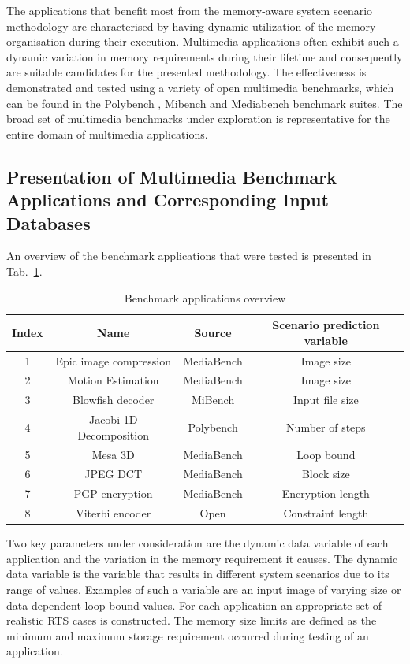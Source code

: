 \documentclass[smallcondensed]{svjour3}
\begin{document}
The applications that benefit most from the memory-aware system scenario methodology are characterised by having dynamic utilization of the memory organisation during their execution. 
Multimedia applications often exhibit such a dynamic variation in memory requirements during their lifetime and consequently are suitable candidates for the presented methodology.
The effectiveness is demonstrated and tested using a variety of open multimedia benchmarks, which can be found in the Polybench \cite{Poly}, Mibench \cite{mibench} and Mediabench \cite{mediabench} benchmark suites.
The broad set of multimedia benchmarks under exploration is representative for the entire domain of multimedia applications. 

\subsection{Presentation of Multimedia Benchmark Applications and Corresponding Input Databases}

An overview of the benchmark applications that were tested is presented in Tab.~\ref{tab:app1}. 

\begin{table}
\caption{Benchmark applications overview}
\label{tab:app1}
{
\begin{tabular}{|c|c|c|c|}
\hline
\textbf{Index} & \textbf{Name} & \textbf{Source} & \textbf{Scenario prediction variable}\\ 
\hline 
1 & Epic image compression & MediaBench & Image size \\ 
\hline 
2 & Motion Estimation & MediaBench 	& Image size \\ 
\hline 
3 & Blowfish decoder & MiBench & Input file size \\ 
\hline 
4 & Jacobi 1D Decomposition & Polybench & Number of steps \\ 
\hline 
5 & Mesa 3D & MediaBench & Loop bound \\ 
\hline 
6 & JPEG DCT & MediaBench & Block size \\ 
\hline 
7 & PGP encryption & MediaBench & Encryption length \\ 
\hline 
8 & Viterbi encoder & Open & Constraint length \\ 
\hline 
\end{tabular}}
\end{table}

Two key parameters under consideration are the dynamic data variable of each application and the variation in the memory requirement it causes. 
The dynamic data variable is the variable that results in different system scenarios due to its range of values. 
Examples of such a variable are an input image of varying size or data dependent loop bound values. 
For each application an appropriate set of realistic RTS cases is constructed. 
The memory size limits are defined as the minimum and maximum storage requirement occurred during testing of an application.
\end{document}
